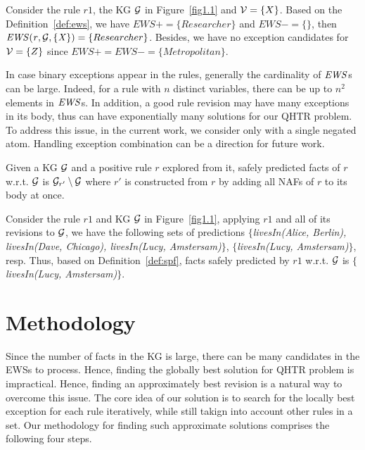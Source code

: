 \begin{example}
Consider the rule $r1$, the KG $\mathcal{G}$ in Figure~\ref{fig1.1} and $\mathcal{V} = \{X\}$. Based on the Definition~\ref{def:ews}, we have $EWS+ = \{Researcher\}$ and $EWS- = \{\}$, then $\mathit{EWS(r,\mathcal{G},\{X\})}=\{Researcher\}$. Besides, we have no exception candidates for $\mathcal{V} = \{Z\}$ since $EWS+ = EWS- = \{Metropolitan\}$.
\end{example}

In case binary exceptions appear in the rules, generally the cardinality of $\mathit{EWS}$s can be large. Indeed, for a rule with $n$ distinct variables, there can be up to $n^2$ elements in $\mathit{EWS}$s. In addition, a good rule revision may have many exceptions in its body, thus can have exponentially many solutions for our QHTR problem. To address this issue, in the current work, we consider only with a single negated atom. Handling exception combination can be a direction for future work.

\begin{definition} \label{def:spf}
Given a KG $\mathcal{G}$ and a positive rule $r$ explored from it, safely predicted facts of $r$ w.r.t. $\mathcal{G}$ is $\mathcal{G}_{r'} \setminus \mathcal{G}$ where $r'$ is constructed from $r$ by adding all NAFs of $r$ to its body at once.
\end{definition}

\begin{example}
Consider the rule $r1$ and KG $\mathcal{G}$ in Figure~\ref{fig1.1}, applying $r1$ and all of its revisions to $\mathcal{G}$, we have the following sets of predictions \textit{$\{$livesIn(Alice, Berlin), livesIn(Dave, Chicago), livesIn(Lucy, Amstersam)$\}$}, \textit{$\{$livesIn(Lucy, Amstersam)$\}$}, resp. Thus, based on Definition~\ref{def:spf}, facts safely predicted by $r1$ w.r.t. $\mathcal{G}$ is \textit{$\{$livesIn(Lucy, Amstersam)$\}$}.
\end{example}

\section{Methodology}\label{sec:meth}

Since the number of facts in the KG is large, there can be many candidates in the EWSs to process. Hence, finding the globally best solution for QHTR problem is impractical. Hence, finding an approximately best revision is a natural way to overcome this issue. The core idea of our solution is to search for the locally best exception for each rule iteratively, while still takign into account other rules in a set. Our methodology for finding such approximate solutions comprises the following four steps.
\medskip

